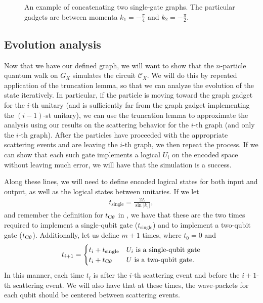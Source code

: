 \documentclass[../thesis-main/thesis-main]{subfiles}
\begin{document}
\begin{figure}
  \centering
   
  \caption{An example of concatenating two single-gate graphs.  The particular gadgets are between momenta $k_1 = -\frac{\pi}{4}$ and $k_2 = -\frac{\pi}{2}$.}
  \label{fig:combining_graphs}
\end{figure}

\subsection{Evolution analysis}

Now that we have our defined graph, we will want to show that the $n$-particle quantum walk on $G_X$ simulates the circuit $\mathcal{C}_X$.  We will do this by repeated application of the truncation lemma, so that we can analyze the evolution of the state iteratively.  In particular, if the particle is moving toward the graph gadget for the $i$-th unitary (and is sufficiently far from the graph gadget implementing the $(i-1)$-st unitary), we can use the truncation lemma to approximate the analysis using our results on the scattering behavior for the $i$-th graph (and only the $i$-th graph).  After the particles have proceeded with the appropriate scattering events and are leaving the $i$-th graph, we then repeat the process.  If we can show that each such gate implements a logical $U_i$ on the encoded space without leaving much error, we will have that the simulation is a success.

Along these lines, we will need to define encoded logical states for both input and output, as well as the logical states between unitaries.  If we let 
\begin{align}
  t_{\text{single}} = \frac{2L}{\sin |k_1|},
\end{align}
and remember the definition for $t_{\mathrm{C}\theta}$ in , we have that these are the two times required to implement a single-qubit gate ($t_{\text{single}}$) and to implement a two-qubit gate ($t_{\mathrm{C}\theta}$).  Additionally, let us define $m+1$ times, where $t_0 = 0$ and 
\begin{align}
  t_{i+1} = \begin{cases} t_i + t_{\text{single}} & U_i \text{ is a single-qubit gate}\\
    t_i + t_{\mathrm{C}\theta} & U \text{ is a two-qubit gate}.\end{cases}
\end{align}
In this manner, each time $t_i$ is after the $i$-th scattering event and before the $i+1$-th scattering event.  We will also have that at these times, the wave-packets for each qubit should be centered between scattering events.  
\end{document}
